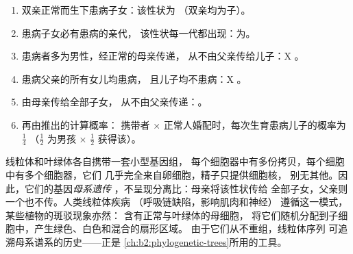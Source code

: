 \begin{method}[读懂系谱图]\label{met:b2:meiosis-heredity:pedigree}
\begin{enumerate}
  \item 双亲正常而生下患病子女：该性状为
        （双亲均为子）。
  \item 患病子女必有患病的亲代，
        该性状每一代都出现：为。
  \item 患病者多为男性，经正常的母亲传递，
        从不由父亲传给儿子：X 。
  \item 患病父亲的所有女儿均患病，
        且儿子均不患病：X 。
  \item 由母亲传给全部子女，
        从不由父亲传递：。
  \item 再由推出的计算概率：
        携带者 $\times$ 正常人婚配时，每次生育患病儿子的概率为 $\tfrac14$
        （$\tfrac12$ 为男孩 $\times$ $\tfrac12$
        获得该）。
\end{enumerate}
\end{method}

\begin{definition}[核外遗传]\label{def:b2:meiosis-heredity:extranuclear}
线粒体和叶绿体各自携带一套小型基因组，
每个细胞器中有多份拷贝，每个细胞中有多个细胞器，它们
几乎完全来自卵细胞，精子只提供细胞核，
别无其他。因此，它们的基因\emph{母系遗传
}，不呈现分离比：母亲将该性状传给
全部子女，父亲则一个也不传。人类线粒体疾病
（呼吸链缺陷，影响肌肉和神经）
遵循这一模式，某些植物的斑驳现象亦然：
含有正常与叶绿体的母细胞，
将它们随机分配到子细胞中，产生绿色、白色和混合的扇形区域。
由于它们从不重组，线粒体序列
可追溯母系谱系的历史——正是
\cref{ch:b2:phylogenetic-trees}所用的工具。
\end{definition}

